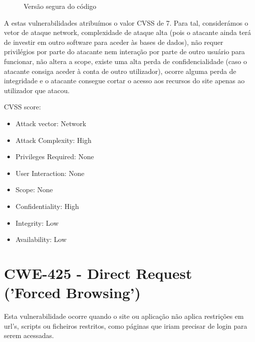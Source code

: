 \documentclass[12pt]{report}
\begin{document}
\begin{figure}[H]{
\centering
{
\caption{Versão segura do código}
}
}\end{figure}
A estas vulnerabilidades atribuímos o valor CVSS de 7. Para tal, considerámos o vetor de ataque network, complexidade de ataque alta (pois o atacante ainda terá de investir em outro software para aceder às bases de dados), não requer privilégios por parte do atacante nem interação por parte de outro usuário para funcionar, não altera a scope, existe uma alta perda de confidencialidade (caso o atacante consiga aceder à conta de outro utilizador), ocorre alguma perda de integridade  e o atacante consegue cortar o acesso aos recursos do site apenas ao utilizador que atacou.\par
CVSS score: \begin{itemize}
  \item Attack vector: Network
  \item Attack Complexity: High
  \item Privileges Required: None
  \item User Interaction: None
  \item Scope: None
  \item Confidentiality: High
  \item Integrity: Low
  \item Availability: Low
\end{itemize}

\newpage
\section{CWE-425 - Direct Request ('Forced Browsing')} \label{425}
Esta vulnerabilidade ocorre quando o site ou aplicação não aplica restrições em url's, scripts ou ficheiros restritos, como páginas que iriam precisar de login para serem acessadas.\par
\end{document}

